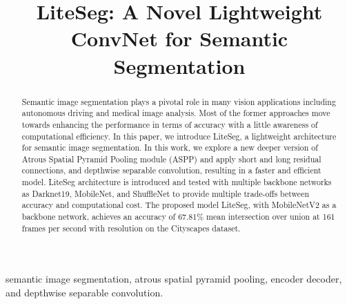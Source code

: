 \documentclass[conference,a4paper]{IEEEtran}
\begin{document}

\title{LiteSeg: A Novel Lightweight ConvNet for Semantic Segmentation
}



\author{
}
\maketitle



\maketitle

\begin{abstract}
Semantic image segmentation plays a pivotal role in many vision applications including autonomous driving and medical image analysis. Most of the former approaches move towards enhancing the performance in terms of accuracy with a little awareness of computational efficiency. In this paper, we introduce LiteSeg, a lightweight architecture for semantic image segmentation. In this work, we explore a new deeper version of Atrous Spatial Pyramid Pooling module (ASPP) and apply short and long residual connections, and depthwise separable convolution, resulting in a faster and efficient model. LiteSeg architecture is introduced and tested with multiple backbone networks as Darknet19, MobileNet, and ShuffleNet to provide multiple trade-offs between accuracy and computational cost. The proposed model LiteSeg, with MobileNetV2 as a backbone network, achieves an accuracy of 67.81\% mean intersection over union at 161 frames per second with  resolution on the Cityscapes dataset. 
\end{abstract}

\begin{IEEEkeywords}
semantic image segmentation, atrous spatial pyramid pooling, encoder decoder, and depthwise separable convolution.
\end{IEEEkeywords}
\end{document}
